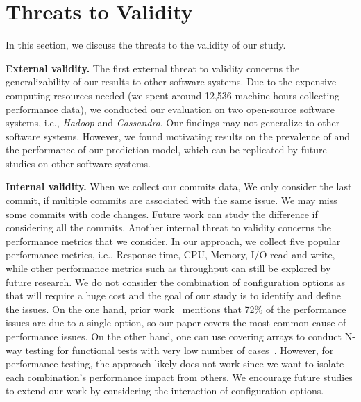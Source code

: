 
\section{Threats to Validity}
\label{sec:threats}
In this section, we discuss the threats to the validity of our study. 

\noindent \textbf{External validity.} The first external threat to validity concerns the generalizability of our results to other software systems. Due to the expensive computing resources needed (we spent around 12,536 machine hours collecting performance data), we conducted our evaluation on two open-source software systems, i.e., \emph{Hadoop} and \emph{Cassandra}. Our findings may not generalize to other software systems. %
However, we found motivating results on the prevalence of \inconsistent and the performance of our prediction model, which can be replicated by future studies on other software systems. %

\noindent \textbf{Internal validity.}
When we collect our commits data, We only consider the last commit, if multiple commits are associated with the same issue. We may miss some commits with code changes. Future work can study the difference if considering all the commits.
Another internal threat to validity concerns the performance metrics that we consider. In our approach, we collect five popular performance metrics, i.e., Response time, CPU, Memory, I/O read and write, while other performance metrics such as throughput can still be explored by future research.%
We do not consider the combination of configuration options as that will require a huge cost and the goal of our study is to identify and define the \inconsistent issues. On the one hand, prior work~\cite{RN2864} mentions that 72\% of the performance issues are due to a single option, so our paper covers the most common cause of performance issues. On the other hand, one can use covering arrays to conduct N-way testing for functional tests with very low number of cases~\cite{colbourn2004combinatorial}. However, for performance testing, the approach likely does not work since we want to isolate each combination's performance impact from others. We encourage future studies to extend our work by considering the interaction of configuration options.

